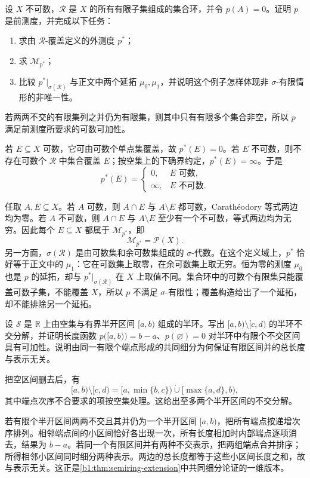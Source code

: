 \begin{exercise}
\label{b1:ex:0208}
设 \(X\) 不可数，\(\mathcal R\) 是 \(X\) 的所有有限子集组成的集合环，并令 \(p(A)=0\)。证明 \(p\) 是前测度，并完成以下任务：
\begin{enumerate}
  \item 求由 \(\mathcal R\)-覆盖定义的外测度 \(p^*\)；
  \item 求 \(\mathcal M_{p^*}\)；
  \item 比较 \(p^*|_{\sigma(\mathcal R)}\) 与正文中两个延拓 \(\mu_0,\mu_1\)，并说明这个例子怎样体现非 \(\sigma\)-有限情形的非唯一性。
\end{enumerate}
\end{exercise}
\begin{solution}
若两两不交的有限集列之并仍为有限集，则其中只有有限多个集合非空，所以 \(p\) 满足前测度所要求的可数可加性。

若 \(E\subseteq X\) 可数，它可由可数个单点集覆盖，故 \(p^*(E)=0\)。若 \(E\) 不可数，则不存在可数个 \(\mathcal R\) 中集合覆盖 \(E\)；按空集上的下确界约定，\(p^*(E)=\infty\)。于是
\[
p^*(E)=
\begin{cases}
0,&E\text{ 可数},\\
\infty,&E\text{ 不可数}.
\end{cases}
\]

任取 \(A,E\subseteq X\)。若 \(A\) 可数，则 \(A\cap E\) 与 \(A\setminus E\) 都可数，Carathéodory 等式两边均为零。若 \(A\) 不可数，则 \(A\cap E\) 与 \(A\setminus E\) 至少有一个不可数，等式两边均为无穷。因此每个 \(E\subseteq X\) 都属于 \(\mathcal M_{p^*}\)，即
\[
\mathcal M_{p^*}=\mathcal P(X).
\]
另一方面，\(\sigma(\mathcal R)\) 是由可数集和余可数集组成的 \(\sigma\)-代数。在这个定义域上，\(p^*\) 恰好等于正文中的 \(\mu_1\)：它在可数集上取零，在余可数集上取无穷。恒为零的测度 \(\mu_0\) 也是 \(p\) 的延拓，却与 \(p^*|_{\sigma(\mathcal R)}\) 在 \(X\) 上取值不同。集合环中的可数个有限集只能覆盖可数子集，不能覆盖 \(X\)，所以 \(p\) 不满足 \(\sigma\)-有限性；覆盖构造给出了一个延拓，却不能排除另一个延拓。
\end{solution}

\begin{exercise}
\label{b1:ex:0209}
设 \(\mathcal S\) 是 \(\mathbb R\) 上由空集与有界半开区间 \([a,b)\) 组成的半环。写出 \([a,b)\setminus[c,d)\) 的半环不交分解，并证明长度函数 \(p\bigl([a,b)\bigr)=b-a\)、\(p(\varnothing)=0\) 对半环中有限个不交区间具有可加性。说明由同一有限个端点形成的共同细分为何保证有限区间并的总长度与表示无关。
\end{exercise}
\begin{solution}
把空区间删去后，有
\[
[a,b)\setminus[c,d)
=[a,\min\{b,c\})\mathbin{\dot\cup}[\max\{a,d\},b),
\]
其中端点次序不合要求的项按空集处理。这给出至多两个半开区间的不交分解。

若有限个半开区间两两不交且其并仍为一个半开区间 \([a,b)\)，把所有端点按递增次序排列。相邻端点间的小区间恰好各出现一次，所有长度相加时内部端点逐项消去，结果为 \(b-a\)。若同一个有限区间并有两种不交表示，把两组端点合并排序；所得相邻小区间同时细分两种表示。两边的总长度都等于这些小区间长度之和，故与表示无关。这正是\cref{b1:thm:semiring-extension}中共同细分论证的一维版本。
\end{solution}

